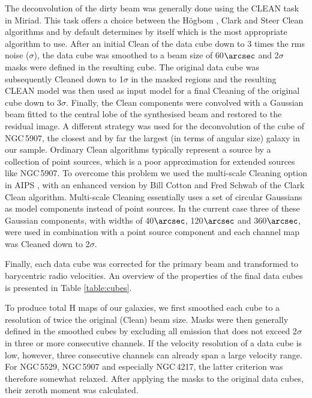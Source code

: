 \documentclass{aa}
\begin{document}
The deconvolution of the dirty beam was generally done using the CLEAN task in Miriad. This task offers a choice between the H\"ogbom \citep{hogbom74}, Clark \citep{clark80} and Steer \citep{steer84} Clean algorithms and by default determines by itself which is the most appropriate algorithm to use. After an initial Clean of the data cube down to 3 times the rms noise ($\sigma$), the data cube was smoothed to a beam size of 60$\arcsec$ and 2$\sigma$ masks were defined in the resulting cube. The original data cube was subsequently Cleaned down to 1$\sigma$ in the masked regions and the resulting CLEAN model was then used as input model for a final Cleaning of the original cube down to 3$\sigma$. Finally, the Clean components were convolved with a Gaussian beam fitted to the central lobe of the synthesised beam and restored to the residual image. A different strategy was used for the deconvolution of the cube of NGC\,5907, the closest and by far the largest (in terms of angular size) galaxy in our sample. Ordinary Clean algorithms typically represent a source by a collection of point sources, which is a poor approximation for extended sources like NGC\,5907. To overcome this problem we used the multi-scale Cleaning option in AIPS \citep{greisen09}, with an enhanced version by Bill Cotton and Fred Schwab \citep{schwab84} of the Clark Clean algorithm. Multi-scale Cleaning essentially uses a set of circular Gaussians as model components instead of point sources. In the current case three of these Gaussian components, with widths of 40$\arcsec$, 120$\arcsec$ and 360$\arcsec$, were used in combination with a point source component and each channel map was Cleaned down to 2$\sigma$.
\par
Finally, each data cube was corrected for the primary beam and transformed to barycentric radio velocities. An overview of the properties of the final data cubes is presented in Table \ref{table:cubes}.
\par
To produce total H{} maps of our galaxies, we first smoothed each cube to a resolution of twice the original (Clean) beam size. Masks were then generally defined in the smoothed cubes by excluding all emission that does not exceed 2$\sigma$ in three or more consecutive channels. If the velocity resolution of a data cube is low, however, three consecutive channels can already span a large velocity range. For NGC\,5529, NGC\,5907 and especially NGC\,4217, the latter criterion was therefore somewhat relaxed. After applying the masks to the original data cubes, their zeroth moment was calculated. 
\end{document}
